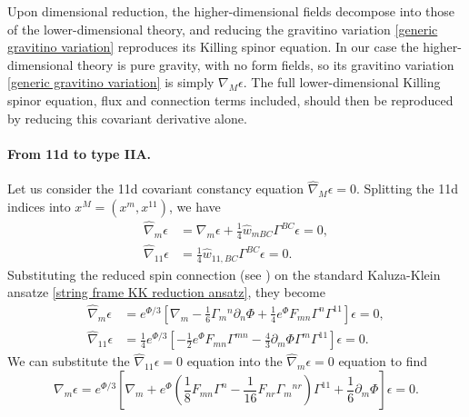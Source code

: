 Upon dimensional reduction, the higher-dimensional fields decompose into those of the lower-dimensional theory, and reducing the gravitino variation \eqref{generic gravitino variation} reproduces its Killing spinor equation.
In our case the higher-dimensional theory is pure gravity, with no form fields, so its gravitino variation \eqref{generic gravitino variation} is simply $\nabla_M\epsilon$.
The full lower-dimensional Killing spinor equation, flux and connection terms included, should then be reproduced by reducing this covariant derivative alone.

\paragraph{From 11d to type IIA.}
Let us consider the 11d covariant constancy equation $\widehat{\nabla}_M \epsilon = 0$.
Splitting the 11d indices into $x^M = (x^m, x^{11})$, we have
\begin{equation}
\begin{aligned}
\widehat{\nabla}_m \epsilon 
&= \nabla_m \epsilon + \frac{1}{4} \widehat{w}_{mBC} \Gamma^{BC} \epsilon = 0,\\  
\widehat{\nabla}_{11} \epsilon 
&= \frac{1}{4} \widehat{w}_{11,BC} \Gamma^{BC} \epsilon = 0.
\end{aligned}
\end{equation}
Substituting the reduced spin connection (see \cite{Ortin:2015hya}) on the standard Kaluza-Klein ansatze \eqref{string frame KK reduction ansatz}, they become
\begin{equation}
\begin{aligned}
\widehat{\nabla}_m \epsilon
&= e^{\Phi/3}\left[ \nabla_m - \frac{1}{6} \Gamma_m{}^n \partial_n \Phi + \frac{1}{4} e^\Phi F_{mn} \Gamma^n \Gamma^{11} \right] \epsilon = 0,\\
\widehat{\nabla}_{11} \epsilon
&=\frac{1}{4} e^{\Phi/3} \left[ -\frac{1}{2} e^{\Phi} F_{mn} \Gamma^{mn} - \frac{4}{3}\partial_m \Phi \Gamma^m \Gamma^{11} \right] \epsilon = 0.
\end{aligned}
\end{equation}
We can substitute the $\widehat{\nabla}_{11} \epsilon = 0$ equation into the $\widehat{\nabla}_m \epsilon = 0$ equation to find
\begin{equation}
\nabla_m \epsilon = e^{\Phi/3} \left[ \nabla_m + e^\Phi \left(\frac{1}{8}F_{mn}\Gamma^n - \frac{1}{16}F_{nr}\Gamma_m{}^{nr}\right) \Gamma^{11} + \frac{1}{6}\partial_m\Phi \right] \epsilon = 0.
\end{equation}
